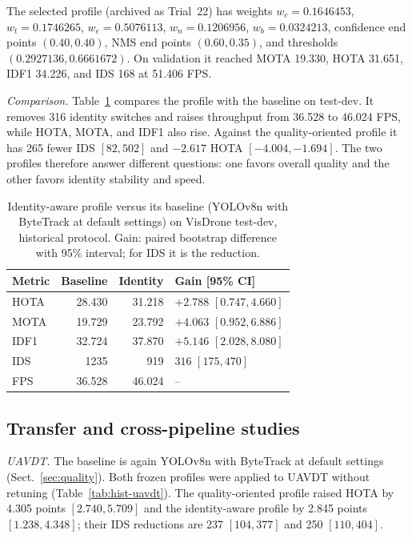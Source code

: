 The selected profile (archived as Trial~22) has weights $w_c=0.1646453$,
$w_t=0.1746265$, $w_e=0.5076113$, $w_n=0.1206956$, $w_b=0.0324213$,
confidence end points $(0.40,0.40)$, NMS end points $(0.60,0.35)$, and
thresholds $(0.2927136, 0.6661672)$. On validation it reached MOTA 19.330,
HOTA 31.651, IDF1 34.226, and IDS 168 at 51.406 FPS.

\emph{Comparison.} Table~\ref{tab:identity} compares the profile with the
baseline on test-dev. It removes 316 identity switches and raises throughput
from 36.528 to 46.024 FPS, while HOTA, MOTA, and IDF1 also rise. Against the
quality-oriented profile it has 265 fewer IDS $[82, 502]$ and $-2.617$ HOTA
$[-4.004, -1.694]$. The two profiles therefore answer different questions: one
favors overall quality and the other favors identity stability and speed.

\begin{table}[t]
\caption{Identity-aware profile versus its baseline (YOLOv8n with ByteTrack at
default settings) on VisDrone test-dev, historical protocol. Gain: paired
bootstrap difference with 95\% interval; for IDS it is the reduction.}
\label{tab:identity}
\centering\footnotesize
\setlength{\tabcolsep}{4pt}
\begin{tabular}{@{}lrrl@{}}
\toprule
Metric & Baseline & Identity & Gain [95\% CI]\\
\midrule
HOTA & 28.430 & 31.218 & $+2.788$ $[0.747, 4.660]$\\
MOTA & 19.729 & 23.792 & $+4.063$ $[0.952, 6.886]$\\
IDF1 & 32.724 & 37.870 & $+5.146$ $[2.028, 8.080]$\\
IDS & 1235 & 919 & $316$ $[175, 470]$\\
FPS & 36.528 & 46.024 & --\\
\bottomrule
\end{tabular}
\end{table}

\subsection{Transfer and cross-pipeline studies}\label{sec:transfer}

\emph{UAVDT.} The baseline is again YOLOv8n with ByteTrack at default settings
(Sect.~\ref{sec:quality}). Both frozen profiles were applied to UAVDT
\cite{du2018uavdt} without retuning (Table~\ref{tab:hist-uavdt}). The
quality-oriented profile raised HOTA by 4.305 points $[2.740, 5.709]$ and the
identity-aware profile by 2.845 points $[1.238, 4.348]$; their IDS reductions
are 237 $[104, 377]$ and 250 $[110, 404]$.

